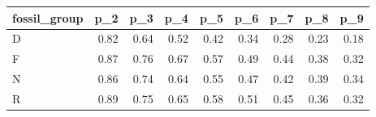 \begin{table}[ht]
\centering
\begin{tabular}{lrrrrrrrr}
  \hline
fossil\_group & p\_2 & p\_3 & p\_4 & p\_5 & p\_6 & p\_7 & p\_8 & p\_9 \\ 
  \hline
D & 0.82 & 0.64 & 0.52 & 0.42 & 0.34 & 0.28 & 0.23 & 0.18 \\ 
  F & 0.87 & 0.76 & 0.67 & 0.57 & 0.49 & 0.44 & 0.38 & 0.32 \\ 
  N & 0.86 & 0.74 & 0.64 & 0.55 & 0.47 & 0.42 & 0.39 & 0.34 \\ 
  R & 0.89 & 0.75 & 0.65 & 0.58 & 0.51 & 0.45 & 0.36 & 0.32 \\ 
   \hline
\end{tabular}
\end{table}
